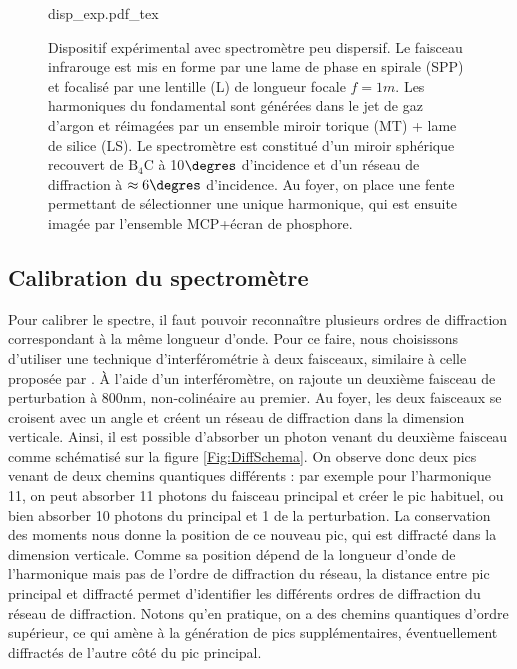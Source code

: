 \begin{figure}[!ht]
\centering
\def\svgwidth{\columnwidth}
{disp_exp.pdf_tex}
\caption{Dispositif expérimental avec spectromètre peu dispersif. Le faisceau infrarouge est mis en forme par une lame de phase en spirale (SPP) et focalisé par une lentille (L) de longueur focale $f=1m$. Les harmoniques du fondamental sont générées dans le jet de gaz d'argon et réimagées par un ensemble miroir torique (MT) + lame de silice (LS). Le spectromètre est constitué d'un miroir sphérique recouvert de $\mathrm{B}_\mathrm{4}\mathrm{C}$ à 10$\degres$ d'incidence et d'un réseau de diffraction à $\approx 6\degres$ d'incidence. Au foyer, on place une fente permettant de sélectionner une unique harmonique, qui est ensuite imagée par l'ensemble MCP+écran de phosphore.}
\label{Fig:DispHartmut}
\end{figure}

\subsection{Calibration du spectromètre}
Pour calibrer le spectre, il faut pouvoir reconnaître plusieurs ordres de diffraction correspondant à la même longueur d'onde. Pour ce faire, nous choisissons d'utiliser une technique d'interférométrie à deux faisceaux, similaire à celle proposée par . \`{A} l'aide d'un interféromètre, on rajoute un deuxième faisceau de perturbation à 800nm, non-colinéaire au premier. Au foyer, les deux faisceaux se croisent avec un angle et créent un réseau de diffraction dans la dimension verticale. Ainsi, il est possible d'absorber un photon venant du deuxième faisceau comme schématisé sur la figure \ref{Fig:DiffSchema}. On observe donc deux pics venant de deux chemins quantiques différents : par exemple pour l'harmonique 11, on peut absorber 11 photons du faisceau principal et créer le pic habituel, ou bien absorber 10 photons du principal et 1 de la perturbation. La conservation des moments nous donne la position de ce nouveau pic, qui est diffracté dans la dimension verticale. Comme sa position dépend de la longueur d'onde de l'harmonique mais pas de l'ordre de diffraction du réseau, la distance entre pic principal et diffracté permet d'identifier 
les différents ordres de diffraction du réseau de diffraction. Notons qu'en pratique, on a des chemins quantiques d'ordre supérieur, ce qui amène à la génération de pics supplémentaires, éventuellement diffractés de l'autre côté du pic principal.


